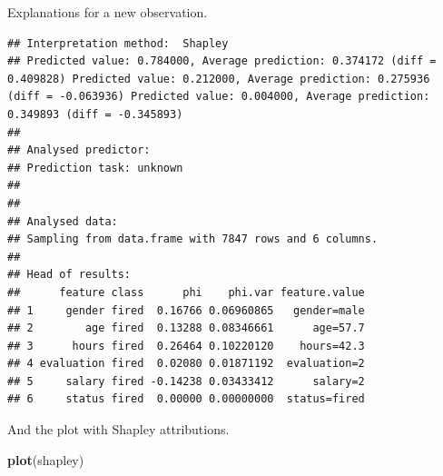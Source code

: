 \documentclass[]{krantz}
\newenvironment{Shaded}{\begin{snugshade}}{\end{snugshade}}
\newcommand{\DataTypeTok}[1]{\textcolor[rgb]{0.13,0.29,0.53}{#1}}
\newcommand{\DecValTok}[1]{\textcolor[rgb]{0.00,0.00,0.81}{#1}}
\newcommand{\FloatTok}[1]{\textcolor[rgb]{0.00,0.00,0.81}{#1}}
\newcommand{\KeywordTok}[1]{\textcolor[rgb]{0.13,0.29,0.53}{\textbf{#1}}}
\newcommand{\NormalTok}[1]{#1}
\newcommand{\OperatorTok}[1]{\textcolor[rgb]{0.81,0.36,0.00}{\textbf{#1}}}
\newcommand{\StringTok}[1]{\textcolor[rgb]{0.31,0.60,0.02}{#1}}
\theoremstyle{definition}
\theoremstyle{definition}
\theoremstyle{definition}
\theoremstyle{remark}
\begin{document}
Explanations for a new observation.

\begin{Shaded}
\end{Shaded}

\begin{verbatim}
## Interpretation method:  Shapley 
## Predicted value: 0.784000, Average prediction: 0.374172 (diff = 0.409828) Predicted value: 0.212000, Average prediction: 0.275936 (diff = -0.063936) Predicted value: 0.004000, Average prediction: 0.349893 (diff = -0.345893)
## 
## Analysed predictor: 
## Prediction task: unknown 
## 
## 
## Analysed data:
## Sampling from data.frame with 7847 rows and 6 columns.
## 
## Head of results:
##      feature class      phi    phi.var feature.value
## 1     gender fired  0.16766 0.06960865   gender=male
## 2        age fired  0.13288 0.08346661      age=57.7
## 3      hours fired  0.26464 0.10220120    hours=42.3
## 4 evaluation fired  0.02080 0.01871192  evaluation=2
## 5     salary fired -0.14238 0.03433412      salary=2
## 6     status fired  0.00000 0.00000000  status=fired
\end{verbatim}

And the plot with Shapley attributions.

\begin{Shaded}
\begin{Highlighting}[]
\KeywordTok{plot}\NormalTok{(shapley)}
\end{Highlighting}
\end{Shaded}
\end{document}
